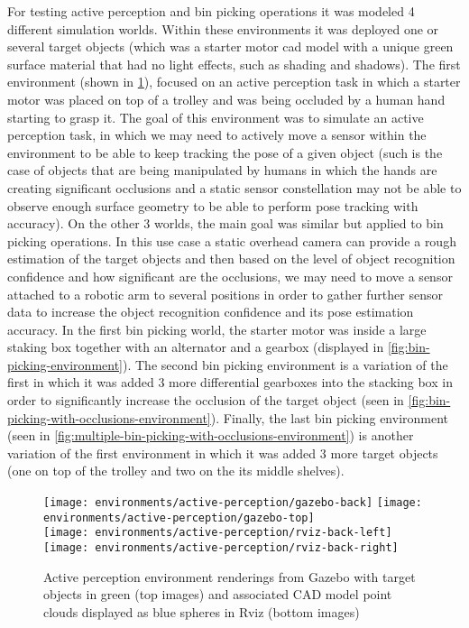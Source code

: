 For testing active perception and bin picking operations it was modeled 4 different simulation worlds. Within these environments it was deployed one or several target objects (which was a starter motor \gls{cad} model with a unique green surface material that had no light effects, such as shading and shadows). The first environment (shown in \cref{fig:active-perception-environment}), focused on an active perception task in which a starter motor was placed on top of a trolley and was being occluded by a human hand starting to grasp it. The goal of this environment was to simulate an active perception task, in which we may need to actively move a sensor within the environment to be able to keep tracking the pose of a given object (such is the case of objects that are being manipulated by humans in which the hands are creating significant occlusions and a static sensor constellation may not be able to observe enough surface geometry to be able to perform pose tracking with accuracy). On the other 3 worlds, the main goal was similar but applied to bin picking operations. In this use case a static overhead camera can provide a rough estimation of the target objects and then based on the level of object recognition confidence and how significant are the occlusions, we may need to move a sensor attached to a robotic arm to several positions in order to gather further sensor data to increase the object recognition confidence and its pose estimation accuracy. In the first bin picking world, the starter motor was inside a large staking box together with an alternator and a gearbox (displayed in \cref{fig:bin-picking-environment}). The second bin picking environment is a variation of the first in which it was added 3 more differential gearboxes into the stacking box in order to significantly increase the occlusion of the target object (seen in \cref{fig:bin-picking-with-occlusions-environment}). Finally, the last bin picking environment (seen in \cref{fig:multiple-bin-picking-with-occlusions-environment}) is another variation of the first environment in which it was added 3 more target objects (one on top of the trolley and two on the its middle shelves).

\begin{figure}
	\centering
	\texttt{[image: environments/active-perception/gazebo-back]}
	\texttt{[image: environments/active-perception/gazebo-top]}\\
	\texttt{[image: environments/active-perception/rviz-back-left]}
	\texttt{[image: environments/active-perception/rviz-back-right]}
	\caption{Active perception environment renderings from Gazebo with target objects in green (top images) and associated CAD model point clouds displayed as blue spheres in Rviz (bottom images)}
	\label{fig:active-perception-environment}
\end{figure}

